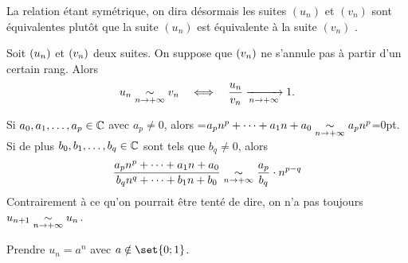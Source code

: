 \documentclass{magnoliaold}
\begin{document}
\begin{remarqueUnique}
\remarque La relation étant symétrique, on dira désormais \og les suites $(u_n)$
  et $(v_n)$ sont équivalentes \fg plutôt que \og la suite $(u_n)$ est
  équivalente à la suite $(v_n)$ \fg.
\end{remarqueUnique}

\begin{proposition}[utile=-3]
Soit $\left(u_n\right)$ et $\left(v_n\right)$ deux suites. On suppose que $\left(v_n\right)$ ne s'annule
pas à partir d'un certain rang. Alors
\[u_n\underset{n\rightarrow +\infty}{\sim} v_n \quad\Longleftrightarrow\quad \frac{u_n}{v_n}
  \xrightarrow[n\rightarrow +\infty]{} 1.\]
\end{proposition}

\begin{remarques}
\remarque Si $a_0,a_1,\ldots,a_p\in\mathbb{C}$ avec $a_p\neq 0$, alors
  =\hbox{$a_p n^p+\cdots+a_1n+a_0\underset{n\rightarrow +\infty}{\sim} a_p n^p$}=0pt.
  Si de plus $b_0,b_1,\ldots,b_q\in\mathbb{C}$ sont tels que $b_q\neq 0$, alors
  \[\frac{a_p n^p+\cdots+a_1 n+a_0}{b_q n^q+\cdots+b_1 n+b_0}\underset{n\rightarrow +\infty}{\sim}
    \frac{a_p}{b_q}\cdot n^{p-q}\]
\remarque Contrairement à ce qu'on pourrait être tenté de dire, on n'a pas
  toujours $u_{n+1}\underset{n\rightarrow +\infty}{\sim}u_n$.
\begin{sol}
Prendre $u_n=a^n$ avec $a\notin \set{0;1}$.
\end{sol}
\end{remarques}
\end{document}
